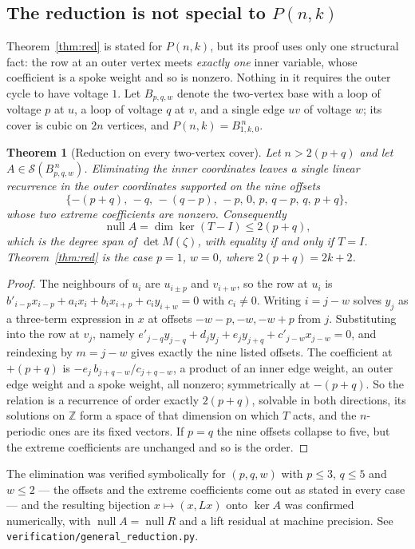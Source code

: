 \documentclass[11pt]{article}
\newtheorem{theorem}{Theorem}
\theoremstyle{definition}
\begin{document}
\subsection*{The reduction is not special to $P(n,k)$}
Theorem~\ref{thm:red} is stated for $P(n,k)$, but its proof uses only one
structural fact: the row at an outer vertex meets \emph{exactly one} inner
variable, whose coefficient is a spoke weight and so is nonzero. Nothing in it
requires the outer cycle to have voltage $1$. Let $B_{p,q,w}$ denote the
two-vertex base with a loop of voltage $p$ at $u$, a loop of voltage $q$ at $v$,
and a single edge $uv$ of voltage $w$; its cover is cubic on $2n$ vertices, and
$P(n,k)=B_{1,k,0}^{\,n}$.

\begin{theorem}[Reduction on every two-vertex cover]\label{thm:red2}
Let $n>2(p+q)$ and let $A\in\mathcal S(B_{p,q,w}^{\,n})$. Eliminating the inner
coordinates leaves a single linear recurrence in the outer coordinates supported
on the nine offsets
\[
  \{-(p+q),\,-q,\,-(q-p),\,-p,\,0,\,p,\,q-p,\,q,\,p+q\},
\]
whose two extreme coefficients are nonzero. Consequently
\[
  \operatorname{null}A=\dim\ker(T-I)\le 2(p+q),
\]
which is the degree span of $\det M(\zeta)$, with equality if and only if $T=I$.
Theorem~\ref{thm:red} is the case $p=1$, $w=0$, where $2(p+q)=2k+2$.
\end{theorem}

\begin{proof}
The neighbours of $u_i$ are $u_{i\pm p}$ and $v_{i+w}$, so the row at $u_i$ is
$b'_{i-p}x_{i-p}+a_ix_i+b_ix_{i+p}+c_iy_{i+w}=0$ with $c_i\ne0$. Writing
$i=j-w$ solves $y_j$ as a three-term expression in $x$ at offsets $-w-p,-w,-w+p$
from $j$. Substituting into the row at $v_j$, namely
$e'_{j-q}y_{j-q}+d_jy_j+e_jy_{j+q}+c'_{j-w}x_{j-w}=0$, and reindexing by
$m=j-w$ gives exactly the nine listed offsets. The coefficient at $+(p+q)$ is
$-e_j\,b_{j+q-w}/c_{j+q-w}$, a product of an inner edge weight, an outer edge
weight and a spoke weight, all nonzero; symmetrically at $-(p+q)$. So the
relation is a recurrence of order exactly $2(p+q)$, solvable in both directions,
its solutions on $\mathbb Z$ form a space of that dimension on which $T$ acts,
and the $n$-periodic ones are its fixed vectors. If $p=q$ the nine offsets
collapse to five, but the extreme coefficients are unchanged and so is the
order.
\end{proof}

\noindent
The elimination was verified symbolically for $(p,q,w)$ with $p\le3$, $q\le5$
and $w\le2$ --- the offsets and the extreme coefficients come out as stated in
every case --- and the resulting bijection $x\mapsto(x,Lx)$ onto $\ker A$ was
confirmed numerically, with $\operatorname{null}A=\operatorname{null}R$ and a
lift residual at machine precision. See
\texttt{verification/general\_reduction.py}.
\end{document}
